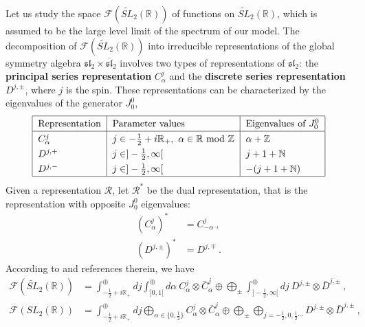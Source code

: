 \documentclass[12pt, a4paper, notitlepage, twoside]{report}
\numberwithin{equation}{section}
\theoremstyle{break}
\begin{document}
Let us study the space $\mathcal{F}(\widetilde{SL}_2(\mathbb{R}))$ of functions on $\widetilde{SL}_2(\mathbb{R})$, which is assumed to be the large level limit of the spectrum of our model. 
The decomposition of $\mathcal{F}(\widetilde{SL}_2(\mathbb{R}))$ into irreducible representations of the global symmetry algebra $\mathfrak{sl}_2\times \overline{\mathfrak{sl}}_2$ involves two types of representations of $\mathfrak{sl}_2$: the \textbf{\boldmath principal series representation} $C^j_\alpha$ and the \textbf{\boldmath discrete series representation} $D^{j,\pm}$, where $j$ is the spin. 
These representations can be characterized by the eigenvalues of the generator $J_0^0$,
\begin{align} 
\renewcommand{\arraystretch}{1.3}
\begin{tabular}{|l|l|l|}
  \hline
Representation & Parameter values & Eigenvalues of $J_0^0$
\\
\hline 
$C^j_\alpha$  & $j\in -\tfrac12+i{\mathbb{R}}_+,\ \alpha\in{\mathbb{R}}\ \text{mod}\ {\mathbb{Z}}$ &  $\alpha + {\mathbb{Z}}$ 
\\
$D^{j,+}$ & $j\in]-\tfrac12,\infty[$ & $j+1+{\mathbb{N}}$
\\
$D^{j,-}$ & $j\in]-\tfrac12,\infty[$ & $-(j+1+{\mathbb{N}})$
\\
\hline 
 \end{tabular}
\label{rpe}
\end{align}
Given a representation $\mathcal{R}$, let $\mathcal{R}^*$ be the dual representation, that is the representation with opposite $J_0^0$ eigenvalues:
\begin{align}
 (C^j_\alpha)^* &= C^j_{-\alpha} \ , 
\\
 (D^{j,\pm})^* &= D^{j,\mp}\ .
\end{align}
According to \cite{rib09} and references therein, we have
\begin{align}
 \mathcal{F}(\widetilde{SL}_2(\mathbb{R})) &= \int^\oplus_{-\frac12+i{\mathbb{R}}_+} dj \int^\oplus_{]0,1[} d\alpha\ C^j_\alpha \otimes \bar{C}^j_{\alpha} \oplus \bigoplus_\pm \int^\oplus_{]-\frac12, \infty[} dj\ D^{j,\pm}\otimes \bar{D}^{j,\pm} \ ,
\label{fst}
\\
 \mathcal{F}(SL_2(\mathbb{R})) &= \int^\oplus_{-\frac12+i{\mathbb{R}}_+} dj \bigoplus_{\alpha\in\{0,\frac12\}} C^j_\alpha \otimes \bar{C}^j_{\alpha} \oplus \bigoplus_\pm \bigoplus_{j=-\frac12, 0,\frac12 \cdots} D^{j,\pm}\otimes \bar{D}^{j,\pm} \ ,
\end{align}
\end{document}
